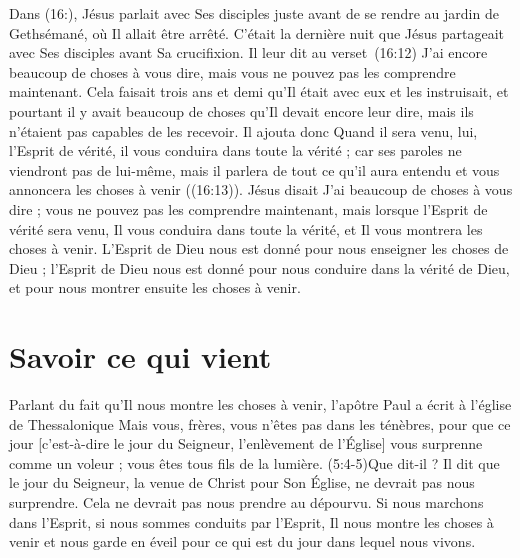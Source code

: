 Dans (16:), Jésus parlait avec Ses disciples juste avant
 de se rendre au jardin de Gethsémané, où Il allait être arrêté.
 C'était la dernière nuit que Jésus partageait avec Ses disciples
 avant Sa crucifixion.
 Il leur dit au verset~(16:12)\frcolon{}
 \Og J'ai encore beaucoup de choses à vous dire,
 mais vous ne pouvez pas les comprendre maintenant. \Fg{}
 Cela faisait trois ans et demi qu'Il était avec eux et les instruisait,
 et pourtant il y avait beaucoup de choses qu'Il devait encore
 leur dire, mais ils n'étaient pas capables de les recevoir.
 Il ajouta donc\frcolon{} \Og Quand il sera venu, lui, l'Esprit de vérité,
 il vous conduira dans toute la vérité ; car ses paroles ne viendront pas
 de lui-même, mais il parlera de tout ce qu'il aura entendu et vous annoncera
 les choses à venir \Fg{} ((16:13)).
 Jésus disait\frcolon{} \Og J'ai beaucoup de choses à vous dire ; vous ne pouvez pas
 les comprendre maintenant, mais lorsque l'Esprit de vérité sera venu,
 Il vous conduira dans toute la vérité, et Il vous montrera les choses
 à venir. \Fg{}
 L'Esprit de Dieu nous est donné pour nous enseigner les choses de Dieu ;
 l'Esprit de Dieu nous est donné pour nous conduire dans la vérité de Dieu,
 et pour nous montrer ensuite les choses à venir.


\section{Savoir ce qui vient}

Parlant du fait qu'Il nous montre les choses à venir,
 l'apôtre Paul a écrit à l'église de Thessalonique\frcolon{}
 \Og Mais vous, frères, vous n'êtes pas dans les ténèbres,
 pour que ce jour [c'est-à-dire le jour du Seigneur,
 l'enlèvement de l'Église] vous surprenne comme un voleur ;
 vous êtes tous fils de la lumière. \Fg{}
 (5:4-5)Que dit-il ?
 Il dit que le jour du Seigneur, la venue de Christ
 pour Son Église, ne devrait pas nous surprendre.
 Cela ne devrait pas nous prendre au dépourvu. Si nous marchons dans l'Esprit,
 si nous sommes conduits par l'Esprit, Il nous montre les choses à venir
 et nous garde en éveil pour ce qui est du jour dans lequel nous vivons.

